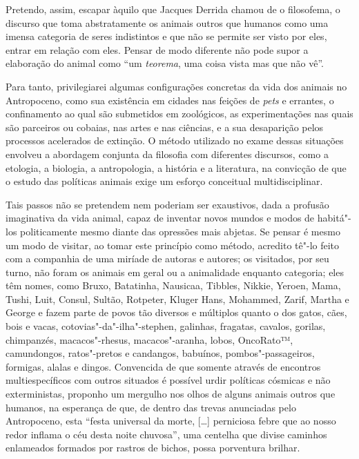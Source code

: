 \begin{multicols}{2}
Pretendo, assim, escapar àquilo que Jacques Derrida chamou de o
filosofema, o discurso que toma abstratamente os animais outros que
humanos como uma imensa categoria de seres indistintos e que não se
permite ser visto por eles, entrar em relação com eles. Pensar de modo
diferente não pode supor a elaboração do animal como ``um
\emph{teorema}, uma coisa vista mas que não vê''.

Para tanto, privilegiarei algumas configurações concretas da vida dos
animais no Antropoceno, como sua existência em cidades nas feições de
\emph{pets} e errantes, o confinamento ao qual são submetidos em
zoológicos, as experimentações nas quais são parceiros ou cobaias, nas
artes e nas ciências, e a sua desaparição pelos processos acelerados de
extinção. O método utilizado no exame dessas situações envolveu a
abordagem conjunta da filosofia com diferentes discursos, como a
etologia, a biologia, a antropologia, a história e a literatura, na
convicção de que o estudo das políticas animais exige um esforço
conceitual multidisciplinar.

Tais passos não se pretendem nem poderiam ser exaustivos, dada a
profusão imaginativa da vida animal, capaz de inventar novos mundos e
modos de habitá"-los politicamente mesmo diante das opressões mais
abjetas. Se pensar é mesmo um modo de visitar, ao tomar este princípio
como método, acredito tê"-lo feito com a companhia de uma miríade de
autoras e autores; os visitados, por seu turno, não foram os animais em
geral ou a animalidade enquanto categoria; eles têm nomes, como Bruxo,
Batatinha, Nausicaa, Tibbles, Nikkie, Yeroen, Mama, Tushi, Luit, Consul,
Sultão, Rotpeter, Kluger Hans, Mohammed, Zarif, Martha e George e fazem
parte de povos tão diversos e múltiplos quanto o dos gatos, cães, bois e
vacas, cotovias"-da"-ilha"-stephen, galinhas, fragatas, cavalos, gorilas,
chimpanzés, macacos"-rhesus, macacos"-aranha, lobos, OncoRato™,
camundongos, ratos"-pretos e candangos, babuínos, pombos"-passageiros,
formigas, alalas e dingos. Convencida de que somente através de
encontros multiespecíficos com outros situados é possível urdir
políticas cósmicas e não exterministas, proponho um mergulho nos olhos
de alguns animais outros que humanos, na esperança de que, de dentro das
trevas anunciadas pelo Antropoceno, esta ``festa universal da morte,
{[}\ldots{}{]} perniciosa febre que ao nosso redor inflama o céu desta noite
chuvosa'', uma centelha que
divise caminhos enlameados formados por rastros de bichos, possa
porventura brilhar.


\noindent{}\textcolor{gray}{\footnotesize{}}
\end{multicols}


